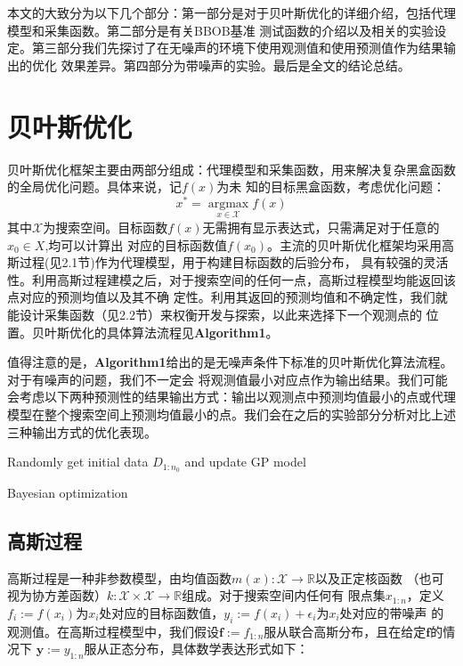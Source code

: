\documentclass[a4paper,10pt]{article}
\begin{document}
本文的大致分为以下几个部分：第一部分是对于贝叶斯优化的详细介绍，包括代理模型和采集函数。第二部分是有关BBOB基准
测试函数的介绍以及相关的实验设定。第三部分我们先探讨了在无噪声的环境下使用观测值和使用预测值作为结果输出的优化
效果差异。第四部分为带噪声的实验。最后是全文的结论总结。

\section{贝叶斯优化}
贝叶斯优化框架主要由两部分组成：代理模型和采集函数，用来解决复杂黑盒函数的全局优化问题。具体来说，记$f(x)$为未
知的目标黑盒函数，考虑优化问题：
\begin{equation}\label{eq1}
x^* = \mathop{\arg\max}\limits_{x \in \mathcal{X}} f(x)
\end{equation}
其中$\mathcal{X}$为搜索空间。目标函数$f(x)$无需拥有显示表达式，只需满足对于任意的$x_0 \in X$,均可以计算出
对应的目标函数值$f(x_0)$。主流的贝叶斯优化框架均采用高斯过程(见2.1节)作为代理模型，用于构建目标函数的后验分布，
具有较强的灵活性。利用高斯过程建模之后，对于搜索空间的任何一点，高斯过程模型均能返回该点对应的预测均值以及其不确
定性。利用其返回的预测均值和不确定性，我们就能设计采集函数（见2.2节）来权衡开发与探索，以此来选择下一个观测点的
位置。贝叶斯优化的具体算法流程见\textbf{Algorithm1}。

值得注意的是，\textbf{Algorithm1}给出的是无噪声条件下标准的贝叶斯优化算法流程。对于有噪声的问题，我们不一定会
将观测值最小对应点作为输出结果。我们可能会考虑以下两种预测性的结果输出方式：输出以观测点中预测均值最小的点或代理
模型在整个搜索空间上预测均值最小的点。我们会在之后的实验部分分析对比上述三种输出方式的优化表现。

\begin{algorithm}[H]
    \SetAlgoLined
  
    Randomly get initial data $D_{1:n_0}$ and update GP model\;
    \caption{Bayesian optimization}
  \end{algorithm}
  \hspace*{\fill}
  \subsection{高斯过程}
高斯过程是一种非参数模型，由均值函数$m(x):\mathcal{X} \rightarrow \mathbb{R}$以及正定核函数
（也可视为协方差函数）$k:\mathcal{X} \times \mathcal{X} \rightarrow \mathbb{R}$组成。对于搜索空间内任何有
限点集$x_{1:n}$，定义$f_i:=f(x_i)$为$x_i$处对应的目标函数值，$y_i:=f(x_i)+\epsilon_i$为$x_i$处对应的带噪声
的观测值。在高斯过程模型中，我们假设$\textbf{f}:=f_{1:n}$服从联合高斯分布，且在给定$\textbf{f}$的情况下
$\textbf{y}:=y_{1:n}$服从正态分布，具体数学表达形式如下：
\end{document}
